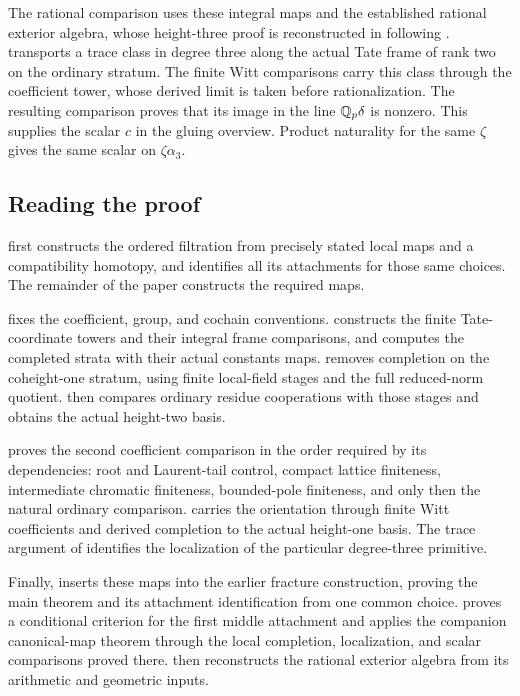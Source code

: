 The rational comparison uses these integral maps and the established
rational exterior algebra, whose height-three proof is reconstructed
in  following \cite{BSSW}.
 transports a trace class in degree three along
the actual Tate frame of rank two on the ordinary stratum.  The finite
Witt comparisons carry this class through the coefficient tower, whose
derived limit is taken before rationalization.  The resulting comparison
proves that its image in the line \(\mathbb Q_p\delta\) is nonzero.  This supplies
the scalar \(c\) in the gluing overview.
Product naturality for the same \(\zeta\) gives the same scalar on
\(\zeta\alpha_3\).

\subsection{Reading the proof}

 first constructs the ordered filtration from
precisely stated local maps and a compatibility homotopy, and identifies
all its attachments for those same choices.  The remainder of the paper
constructs the required maps.

 fixes the coefficient, group, and cochain
conventions.   constructs the finite Tate-coordinate
towers and their integral frame comparisons, and
 computes the completed strata with their actual
constants maps.   removes completion on the
coheight-one stratum, using finite local-field stages and the full
reduced-norm quotient.   then compares ordinary
residue cooperations with those stages and obtains the actual
height-two basis.

 proves the second coefficient comparison in the
order required by its dependencies: root and Laurent-tail control,
compact lattice finiteness, intermediate chromatic finiteness,
bounded-pole finiteness, and only then the natural ordinary comparison.
 carries the orientation through finite Witt
coefficients and derived completion to the actual height-one basis.
The trace argument of  identifies the localization of the
particular degree-three primitive.

Finally,  inserts these maps into the earlier
fracture construction, proving the main theorem and its attachment
identification from one common choice.   proves a
conditional criterion for the first middle attachment and applies the
companion canonical-map theorem through the local completion,
localization, and scalar comparisons proved there.
 then reconstructs the rational exterior
algebra from its arithmetic and geometric inputs.
